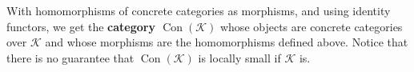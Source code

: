 With homomorphisms of concrete categories as morphisms, and using identity functors, we get the \textbf{category $\operatorname{Con}(\mathcal{K})$} whose objects are concrete categories over $\mathcal{K}$ and whose morphisms are the homomorphisms defined above. Notice that there is no guarantee that $\operatorname{Con}(\mathcal{K})$ is locally small if $\mathcal{K}$ is.
